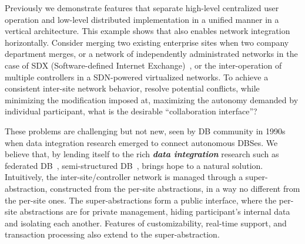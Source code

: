 \label{ssec:integration-integration}
Previously we demonstrate \Sys features that separate high-level
centralized user operation and low-level distributed implementation in
a unified manner in a vertical
architecture.%
This example shows that \Sys also enables network integration
horizontally.  Consider merging two existing enterprise sites when two
company department merges, or a network of independently administrated
networks in the case of SDX (Software-defined Internet
Exchange)~\cite{sdx}, or the inter-operation of multiple controllers
in a SDN-powered virtualized networks. To achieve a consistent
inter-site network behavior, resolve potential conflicts, while
minimizing the modification imposed at, maximizing the autonomy
demanded by individual participant, what is the desirable
``collaboration interface''? 

These problems are challenging but not new, seen by DB community in
1990s when data integration research emerged to connect autonomous
DBSes. We believe that, by lending itself to the rich
\textbf{\textit{data integration}} research such as federated
DB~\cite{Sheth:1990:federated-DB}, semi-structured
DB~\cite{lore,semistructured}, \Sys brings hope to a natural
solution. Intuitively, the inter-site/controller network is managed
through a super-abstraction, constructed from the per-site
abstractions, in a way no different from the per-site ones. The
super-abstractions form a public interface, where the per-site
abstractions are for private management, hiding participant's internal
data and isolating each another. Features of customizability,
real-time support, and transaction processing also extend to the
super-abstraction.
